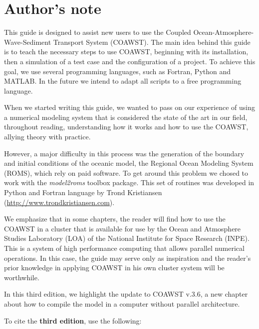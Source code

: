 \chapter*{Author's note}
\bigskip
\noindent This guide is designed to assist new users to use the Coupled Ocean-Atmosphere-Wave-Sediment Transport System (COAWST). The main idea behind this 
guide is to teach the necessary steps to use COAWST, beginning with its installation, then a simulation of a test case and the configuration of a
project. To achieve this goal, we use several programming languages, such as Fortran, Python and MATLAB. In the future we intend to adapt all scripts
to a free programming language.
\bigskip

\noindent When we started writing this guide, we wanted to pass on our experience of using a numerical modeling system that is considered the state of the art in our field, 
throughout reading, understanding how it works and how to use the COAWST, allying theory with practice.
\bigskip

\noindent However, a major difficulty in this process was the generation of the boundary and initial conditions of the oceanic model, the Regional Ocean Modeling System (ROMS),
which rely on paid software. To get around this problem we chosed to work with the \textit {model2roms} toolbox package. This set of routines was developed in Python and 
Fortran language by Trond Kristiansen (\textcolor{bleu_cite} {\href{http://www.trondkristiansen.com}{http://www.trondkristiansen.com}}).
\bigskip

\noindent We emphasize that in some chapters, the reader will find how to use the COAWST in a cluster that is available for use by the Ocean and Atmosphere 
Studies Laboratory (LOA) of the National Institute for Space Research (INPE). This is a system of high performance computing that allows parallel numerical operations. 
In this case, the guide may serve only as inspiration and the reader's prior knowledge in applying COAWST in his own cluster system will be worthwhile.
\bigskip

\noindent In this third edition, we highlight the update to COAWST v.3.6, a new chapter about how to compile the model in a computer without parallel architecture.
\bigskip

\noindent To cite the \textbf{third edition}, use the following:
\bigskip

\bigskip
\pagebreak 

